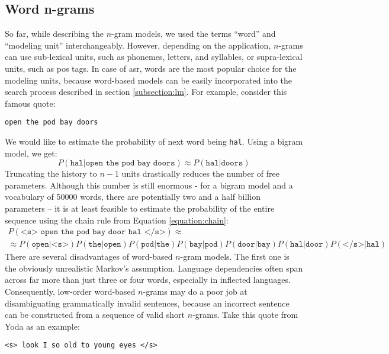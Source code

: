 	\subsection{Word n-grams}
	So far, while describing the \mbox{$n$-gram} models, we used the terms ``word'' and ``modeling unit'' interchangeably. However, depending on the application, \mbox{$n$-gram}s can use sub-lexical units, such as phonemes, letters, and syllables, or supra-lexical units, such as \gls{pos} tags. In case of \gls{asr}, words are the most popular choice for the modeling units, because word-based models can be easily incorporated into the search process described in section \ref{subsection:lm}. For example, consider this famous quote:
	\begin{center}
		\texttt{open the pod bay doors}
	\end{center}
	We would like to estimate the probability of next word being \texttt{hal}. Using a bigram model, we get:
	\begin{equation}
		P(\texttt{hal}|\texttt{open the pod bay doors}) \approx P(\texttt{hal}|\texttt{doors})
	\end{equation}
	Truncating the history to $n-1$ units drastically reduces the number of free parameters. Although this number is still enormous - for a bigram model and a vocabulary of 50000 words, there are potentially two and a half billion parameters -- it is at least feasible to estimate the probability of the entire sequence using the chain rule from Equation \ref{equation:chain}:
	\begin{multline}
		P(\texttt{<s> open the pod bay door hal </s>}) \approx \\
		\approx P(\texttt{open}|\texttt{<s>})P(\texttt{the}|\texttt{open})P(\texttt{pod}|\texttt{the})P(\texttt{bay}|\texttt{pod})P(\texttt{door}|\texttt{bay})P(\texttt{hal}|\texttt{door})P(\texttt{</s>}|\texttt{hal})
	\end{multline}
	There are several disadvantages of word-based \mbox{$n$-gram} models. The first one is the obviously unrealistic Markov's assumption. Language dependencies often span across far more than just three or four words, especially in inflected languages. Consequently, low-order word-based \mbox{$n$-gram}s may do a poor job at disambiguating grammatically invalid sentences, because an incorrect sentence can be constructed from a sequence of valid short \mbox{$n$-gram}s. Take this quote from Yoda as an example:
	\begin{center}
		\texttt{<s> look I so old to young eyes </s>}
	\end{center}
